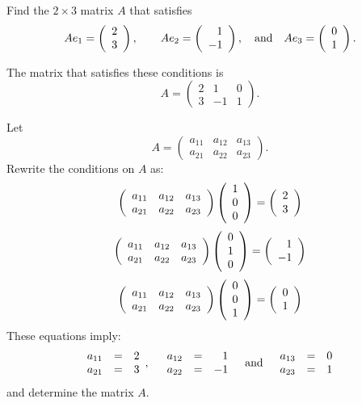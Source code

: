 \documentclass{ximera}
\begin{document}
\begin{exercise} \label{c4.3.7}
Find the $2\times 3$ matrix $A$ that satisfies
\[
Ae_1  =  \left(\begin{array}{r} 2 \\ 3\end{array}\right),\qquad
Ae_2  =  \left(\begin{array}{r} 1 \\ -1\end{array}\right), \quad\mbox{and}\quad
Ae_3  = \left(\begin{array}{r} 0 \\ 1\end{array}\right).
\]

\begin{solution}

\ans The matrix that satisfies these conditions is
\[
A = \left(\begin{array}{rrr} 2 & 1 & 0 \\ 3 & -1 & 1
\end{array}\right).
\]

\soln Let
\[
A = \left(\begin{array}{rrr}
a_{11} & a_{12} & a_{13} \\ a_{21} & a_{22} & a_{23}
\end{array}\right).
\]
Rewrite the conditions on $A$ as:
\[
\left(\begin{array}{rrr}
a_{11} & a_{12} & a_{13} \\ a_{21} & a_{22} & a_{23}
\end{array}\right) \left(\begin{array}{r} 1 \\ 0 \\ 0\end{array}\right) = \left(\begin{array}{r} 2 \\ 3\end{array}\right)
\]
\[
\left(\begin{array}{rrr}
a_{11} & a_{12} & a_{13} \\ a_{21} & a_{22} & a_{23}
\end{array}\right) \left(\begin{array}{r} 0 \\ 1 \\ 0\end{array}\right) = \left(\begin{array}{r} 1 \\ -1\end{array}\right)
\]
\[
\left(\begin{array}{rrr}
a_{11} & a_{12} & a_{13} \\ a_{21} & a_{22} & a_{23}
\end{array}\right) \left(\begin{array}{r} 0 \\ 0 \\ 1\end{array}\right) = \left(\begin{array}{r} 0 \\ 1\end{array}\right)
\]
These equations imply:
\[ \begin{array}{rcl} a_{11} & = & 2 \\ a_{21} & = & 3 \end{array},
\quad
\begin{array}{rcr} a_{12} & = & 1 \\ a_{22} & = & -1 \end{array}
\quad\mbox{and}\quad
\begin{array}{rcl} a_{13} & = & 0 \\ a_{23} & = & 1 \end{array}
\]
and determine the matrix $A$.

\end{solution}
\end{exercise}
\end{document}
